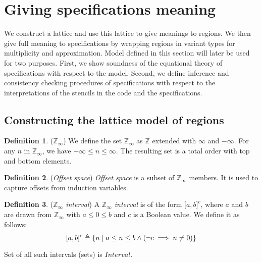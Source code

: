 \documentclass{article}
\theoremstyle{definition}
\newtheorem{defn}{Definition}
\theoremstyle{plain}
\newcommand{\zinf}{\textnormal{$\mathbb{Z}_\infty$}}
\newcommand{\interv}[3]{\textnormal{$\lbrack#1,#2\rbrack^{#3}$}}
\begin{document}
\section{Giving specifications meaning}

We construct a lattice and use this lattice to give meanings to regions. We
then give full meaning to specifications by wrapping regions in variant types
for multiplicity and approximation. Model defined in this section will later be
used for two purposes. First, we show soundness of the equational theory of
specifications with respect to the model. Second, we define inference and
consistency checking procedures of specifications with respect to the
interpretations of the stencils in the code and the specifications.

\subsection{Constructing the lattice model of regions}

\begin{defn}{(\zinf)}
  We define the set \zinf{} as $\mathbb{Z}$ extended with $\infty$ and
  $-\infty$. For any $n$ in \zinf{}, we have $-\infty \leq n \leq \infty$. The
  resulting set is a total order with top and bottom elements.
\end{defn}

\begin{defn}{(\emph{Offset space})}
  \emph{Offset space} is a subset of \zinf{} members. It is used to capture
  offsets from induction variables.

\end{defn}

\begin{defn}{(\emph{\zinf{} interval})}
  A \emph{\zinf{} interval} is of the form \interv{a}{b}{c}, where $a$ and $b$
  are drawn from \zinf{} with $a \leq 0 \leq b$ and $c$ is a Boolean value. We
  define it as follows:
%
  \begin{equation*}
    \interv{a}{b}{c} \triangleq
      \{ n \;|\; a \leq n \leq b \wedge (\neg c \implies n \neq 0) \}
  \end{equation*}

  Set of all such intervals (sets) is $\textit{Interval}$.
\end{defn}
\end{document}
